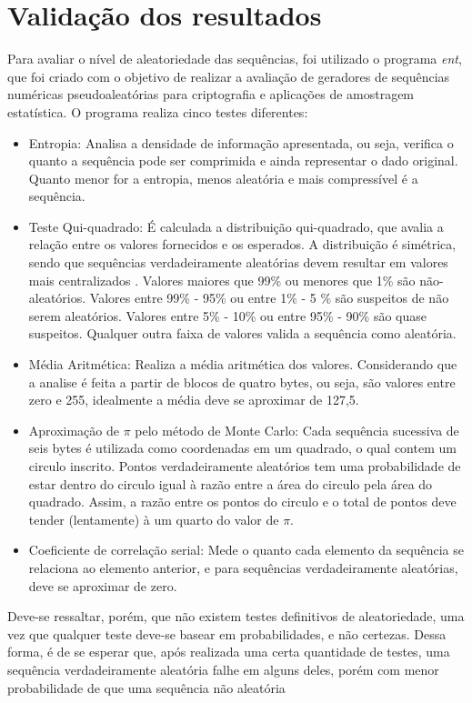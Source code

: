 \section{Validação dos resultados}
Para avaliar o nível de aleatoriedade das sequências, foi utilizado o programa \textit{ent}, que foi criado com o objetivo de realizar a avaliação de geradores de sequências numéricas pseudoaleatórias para criptografia e aplicações de amostragem estatística. O programa realiza cinco testes diferentes:
\begin{itemize}
\item Entropia: Analisa a densidade de informação apresentada, ou seja, verifica o quanto a sequência pode ser comprimida e ainda representar o dado original. Quanto menor for a entropia, menos aleatória e mais compressível é a sequência.
\item Teste Qui-quadrado: É calculada a distribuição qui-quadrado, que avalia a relação entre os valores fornecidos e os esperados. A distribuição é simétrica, sendo que sequências verdadeiramente aleatórias devem resultar em valores mais centralizados \cite{knuth1998art}. Valores maiores que 99\% ou menores que 1\% são não-aleatórios. Valores entre 99\% - 95\% ou entre 1\% - 5 \% são suspeitos de não serem aleatórios. Valores entre 5\% - 10\% ou entre 95\% - 90\% são quase suspeitos. Qualquer outra faixa de valores valida a sequência como aleatória. 
\item Média Aritmética: Realiza a média aritmética dos valores. Considerando que a analise é feita a partir de blocos de quatro bytes, ou seja, são valores entre zero e 255, idealmente a média deve se aproximar de 127,5. 
\item Aproximação de $\pi$ pelo método de Monte Carlo: Cada sequência sucessiva de seis bytes é utilizada como coordenadas em um quadrado, o qual contem um circulo inscrito. Pontos verdadeiramente aleatórios tem uma probabilidade de estar dentro do circulo igual à razão entre a área do circulo pela área do quadrado. Assim, a razão entre os pontos do circulo e o total de pontos deve tender (lentamente) à um quarto do valor de $\pi$.
\item Coeficiente de correlação serial: Mede o quanto cada elemento da sequência se relaciona ao elemento anterior, e para sequências verdadeiramente aleatórias, deve se aproximar de zero.
\end{itemize}
Deve-se ressaltar, porém, que não existem testes definitivos de aleatoriedade, uma vez que qualquer teste deve-se basear em probabilidades, e não certezas. Dessa forma, é de se esperar que, após realizada uma certa quantidade de testes, uma sequência verdadeiramente aleatória falhe em alguns deles, porém com menor probabilidade de que uma sequência não aleatória